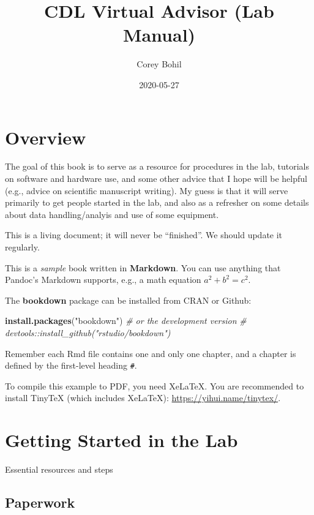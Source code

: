 \documentclass[
]{book}
\title{CDL Virtual Advisor (Lab Manual)}
\author{Corey Bohil}
\date{2020-05-27}
\newenvironment{Shaded}{\begin{snugshade}}{\end{snugshade}}
\newcommand{\CommentTok}[1]{\textcolor[rgb]{0.56,0.35,0.01}{\textit{#1}}}
\newcommand{\KeywordTok}[1]{\textcolor[rgb]{0.13,0.29,0.53}{\textbf{#1}}}
\newcommand{\NormalTok}[1]{#1}
\newcommand{\StringTok}[1]{\textcolor[rgb]{0.31,0.60,0.02}{#1}}
\begin{document}
\maketitle

{
\setcounter{tocdepth}{1}
\tableofcontents
}
\hypertarget{overview}{%
\chapter{Overview}\label{overview}}

The goal of this book is to serve as a resource for procedures in the lab, tutorials on software and hardware use, and some other advice that I hope will be helpful (e.g., advice on scientific manuscript writing). My guess is that it will serve primarily to get people started in the lab, and also as a refresher on some details about data handling/analyis and use of some equipment.

This is a living document; it will never be ``finished''. We should update it regularly.

This is a \emph{sample} book written in \textbf{Markdown}. You can use anything that Pandoc's Markdown supports, e.g., a math equation \(a^2 + b^2 = c^2\).

The \textbf{bookdown} package can be installed from CRAN or Github:

\begin{Shaded}
\begin{Highlighting}[]
\KeywordTok{install.packages}\NormalTok{(}\StringTok{"bookdown"}\NormalTok{)}
\CommentTok{# or the development version}
\CommentTok{# devtools::install_github("rstudio/bookdown")}
\end{Highlighting}
\end{Shaded}

Remember each Rmd file contains one and only one chapter, and a chapter is defined by the first-level heading \texttt{\#}.

To compile this example to PDF, you need XeLaTeX. You are recommended to install TinyTeX (which includes XeLaTeX): \url{https://yihui.name/tinytex/}.

\hypertarget{getting_started}{%
\chapter{Getting Started in the Lab}\label{getting_started}}

Essential resources and steps

\hypertarget{paperwork}{%
\section{Paperwork}\label{paperwork}}
\end{document}
